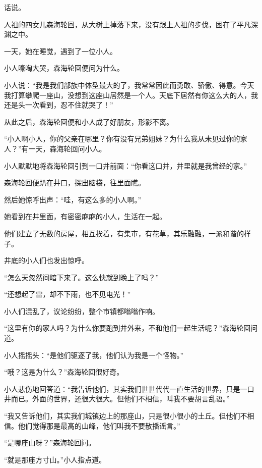 
\begin{this_body}



话说。

人祖的四女儿森海轮回，从大树上掉落下来，没有跟上人祖的步伐，困在了平凡深渊之中。

一天，她在睡觉，遇到了一位小人。

小人嚎啕大哭，森海轮回便问为什么。

小人说：“我是我们部族中体型最大的了，我常常因此而勇敢、骄傲、得意。今天我打算攀爬一座山，没想到这座山居然是一个人。天底下居然有你这么大的人，我还是头一次看到，忍不住就哭了！”

从此之后，森海轮回便和小人成了好朋友，形影不离。

“小人啊小人，你的父亲在哪里？你有没有兄弟姐妹？为什么我从未见过你的家人？”有一天，森海轮回问小人。

小人默默地将森海轮回引到一口井前面：“你看这口井，井里就是我曾经的家。”

森海轮回便趴在井口，探出脑袋，往里面瞧。

然后她惊呼出声：“哇，有这么多的小人啊。”

她看到在井里面，有密密麻麻的小人，生活在一起。

他们建立了无数的房屋，相互挨着，有集市，有花草，其乐融融，一派和谐的样子。

井底的小人们也发出惊呼。

“怎么天忽然间暗下来了。这么快就到晚上了吗？”

“还想起了雷，却不下雨，也不见电光！”

小人们混乱了，议论纷纷，整个市镇都嗡嗡作响。

“这里有你的家人吗？为什么你要跑到井外来，不和他们一起生活呢？”森海轮回问道。

小人摇摇头：“是他们驱逐了我，他们认为我是一个怪物。”

“哦？这是为什么？”森海轮回很好奇。

小人悲伤地回答道：“我告诉他们，其实我们世世代代一直生活的世界，只是一口井而已。外面的世界，还很大很大。但他们不相信，叫我不要胡言乱语。”

“我又告诉他们，其实我们城镇边上的那座山，只是很小很小的土丘。但他们不相信。他们觉得那是最高的山峰，他们叫我不要散播谣言。”

“是哪座山呀？”森海轮回问。

“就是那座方寸山。”小人指点道。


\end{this_body}
